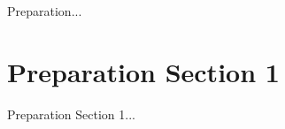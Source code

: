 \label{sec:2}

Preparation...

\section{Preparation Section 1}
\label{sec:2.1}

Preparation Section 1... 
